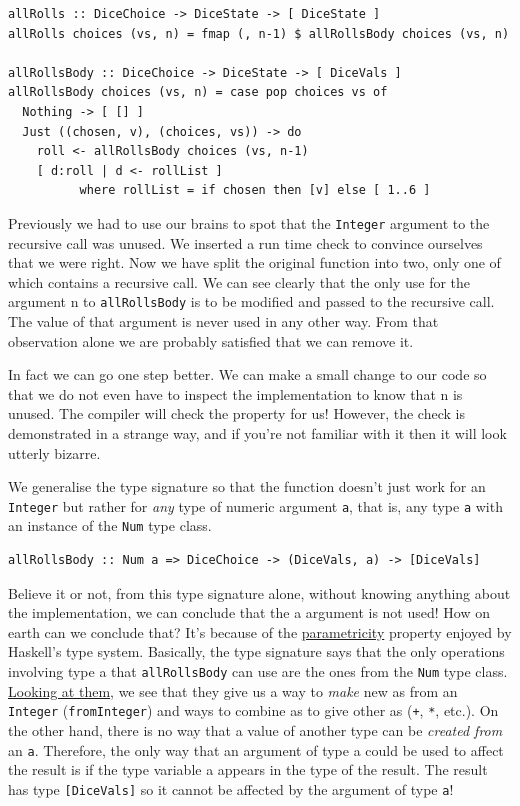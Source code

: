 \begin{verbatim}
allRolls :: DiceChoice -> DiceState -> [ DiceState ]
allRolls choices (vs, n) = fmap (, n-1) $ allRollsBody choices (vs, n)

allRollsBody :: DiceChoice -> DiceState -> [ DiceVals ]
allRollsBody choices (vs, n) = case pop choices vs of
  Nothing -> [ [] ]
  Just ((chosen, v), (choices, vs)) -> do
    roll <- allRollsBody choices (vs, n-1)
    [ d:roll | d <- rollList ]
          where rollList = if chosen then [v] else [ 1..6 ]
\end{verbatim}
Previously we had to use our brains to spot that the \texttt{Integer} argument to the recursive call was unused. We inserted a run time check to convince ourselves that we were right. Now we have split the original function into two, only one of which contains a recursive call. We can see clearly that the only use for the argument n to \texttt{allRollsBody} is to be modified and passed to the recursive call. The value of that argument is never used in any other way. From that observation alone we are probably satisfied that we can remove it.

In fact we can go one step better. We can make a small change to our code so that we do not even have to inspect the implementation to know that n is unused. The compiler will check the property for us! However, the check is demonstrated in a strange way, and if you're not familiar with it then it will look utterly bizarre.

We generalise the type signature so that the function doesn't just work for an \texttt{Integer} but rather for \textit{any} type of numeric argument \texttt{a}, that is, any type \texttt{a} with an instance of the \texttt{Num} type class.

\begin{verbatim}
allRollsBody :: Num a => DiceChoice -> (DiceVals, a) -> [DiceVals]
\end{verbatim}
Believe it or not, from this type signature alone, without knowing anything about the implementation, we can conclude that the a argument is not used! How on earth can we conclude that? It's because of the \href{https://en.wikipedia.org/wiki/Parametricity}{parametricity} property enjoyed by Haskell's type system. Basically, the type signature says that the only operations involving type a that \texttt{allRollsBody} can use are the ones from the \texttt{Num} type class. \href{https://www.stackage.org/haddock/lts-13.21/base-4.12.0.0/Prelude.html#t:Num}{Looking at them}, we see that they give us a way to \textit{make} new as from an \texttt{Integer} (\texttt{fromInteger}) and ways to combine as to give other as (\texttt{+}, \texttt{*}, etc.). On the other hand, there is no way that a value of another type can be \textit{created from} an \texttt{a}. Therefore, the only way that an argument of type a could be used to affect the result is if the type variable a appears in the type of the result. The result has type \texttt{[DiceVals]} so it cannot be affected by the argument of type \texttt{a}!

